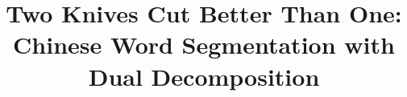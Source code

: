 \documentclass[11pt,letterpaper]{article}
\title{Two Knives Cut Better Than One: \\ Chinese Word Segmentation with Dual Decomposition} %
\begin{document}
\maketitle
\begin{CJK}{UTF8}{gbsn} %

 
 \label{sec:intro}
 \label{sec:models}
 \label{sec:dual-decomp}
 \label{sec:experiment}
 \label{sec:results}
 \label{sec:discussion}
 \label{sec:conclusion}




\end{CJK}
\end{document}
